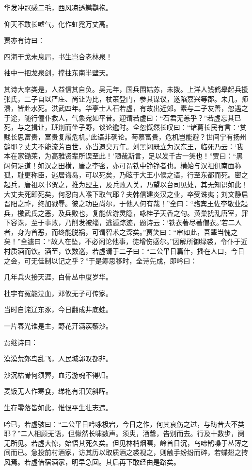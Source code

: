 \documentclass[a4paper,12pt,UTF8,twoside]{ctexbook}
\begin{document}
华发冲冠感二毛，西风凉透鹣鹴袍。

仰天不敢长嘘气，化作虹霓万丈高。

贾亦有诗曰：

四海干戈未息肩，书生岂合老林泉！

袖中一把龙泉剑，撑拄东南半壁天。

其诗大率类是，人益信其自负。吴元年，国兵围姑苏，未拨。上洋人钱鹤皋起兵援张氏，二子自以严庄、尚让为比，杖策登门，参其谋议，遂陷嘉兴等郡。未几，师溃，皆赴水死。洪武四年。华亭士人石若虚，有故出近郊。素与二子友善，忽遇之于途，随行僮仆救人，气象宛如平昔。迎谓若虚曰：“石君无恙乎？”若虚忘其已死，与之揖让，班荆而坐子野，谈论逾时。全忽慨然长叹曰：“诸葛长民有言：‘贫贱长思富贵，富贵复履危机。’此语非确论。苟慕富贵，危机岂能避？世间宁有扬州鹤耶？丈夫不能流芳百世，亦当遗臭万年。刘黑闼既立为汉东王，临死乃云：‘我本在家锄莱，为高雅贤辈所误至此！’陋哉斯言，足以发千古一笑也！”贾曰：“黑闼何足道！如汉之田横，唐之李密，亦可谓铁中铮铮者也。横始与汉祖俱南面称孤，耻更称臣，逃居诲岛，可以死矣，乃眩于大王小侯之语，行至东都而死。密之起兵，唐祖以书贺之，推为盟主，及兵败入关，乃望以台司见处，其无知识如此！大丈夫死即死矣，何忍向人喉下取气耶？夫韩信建炎汉之业，卒受诛夷；刘文静启晋阳之祚，终加戮辱。彼之功臣尚尔，于他人何有哉！”全曰：“骆宾王佐李敬业起兵，檄武氏之恶，及兵败也，复能优游灵隐，咏桂子天香之句。黄巢扰乱唐室，罪下容诛，至于事败，乃削发被缁，逃遁踪迹，题诗云：‘铁衣著尽著僧衣。’若二人者，身为首恶，而终能脱祸，可谓智术之深矣。”贾笑曰：“审如此，吾辈当愧之矣！”全遽曰：“故人在坠，不必闲论他事，徒增伤感尔。”因解所御绿裘，令仆于近村质酒而饮。酒至，饮数巡，若虚请于二子曰：“二公平日篇什，播在人口，今日之会，可无佳制以记之乎？”于是筹思移时，全诗先成，即吟曰：

几年兵火接天涯，白骨丛中度岁华。

杜宇有冤能泣血，邓攸无子可传家。

当时自诧辽东豕，今日翻成井底蛙。

一片春光谁是主，野花开满蒺藜沙。

贾继诗曰：

漠漠荒郊鸟乱飞，人民城郭叹都非。

沙沉枯骨何须葬，血污游魂不得归。

麦饭无人作寒食，绨袍有泪哭斜晖。

生存零落皆如此，惟恨平生壮志违。

吟已，若虚骇曰：“二公平日吟咏极宕，今日之作，何其哀伤之过，与畴昔大不类耶？”二人相顾无语，但愀然长啸数声。须臾，酒罄，告别而去。行及十数步，阒无所见。若虚大惊，始悟其死久矣。但见林梢烟瞑，岭首日沉，乌啼鹊噪于丛薄之间而已。急投前村酒家，访其历以取质酒之裘视之，则触手纷纷而碎，若蝶翅之抟风焉。若虚借宿酒家，明早急回。其后再下敢经由是路矣。
\end{document}

